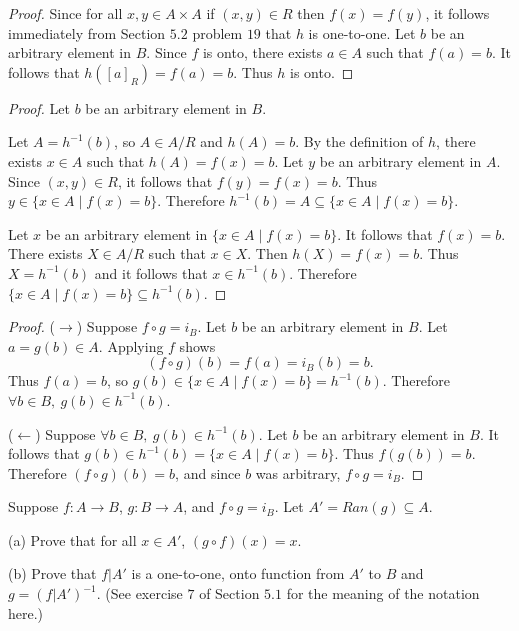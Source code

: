 \begin{proof}
    Since for all $x, y \in A \times A$
        if $(x, y) \in R$ then $f(x) = f(y)$,
        it follows immediately from Section $5.2$ 
        problem $19$ that $h$ is one-to-one.
    Let $b$ be an arbitrary element in $B$.
    Since $f$ is onto, there exists $a \in A$
        such that $f(a) = b$.
    It follows that $h([a]_R) = f(a) = b$.
    Thus $h$ is onto.
\end{proof}

\begin{proof}
    Let $b$ be an arbitrary element in $B$.

    Let $A = h^{-1}(b)$, so $A \in A / R$ and $h(A) = b$.
    By the definition of $h$, there exists $x \in A$ such that $h(A) = f(x) = b$.
    Let $y$ be an arbitrary element in $A$.
    Since $(x, y) \in R$, it follows that $f(y) = f(x) = b$.
    Thus $y \in \{x \in A \mid f(x) = b\}$.
    Therefore $h^{-1}(b) = A \subseteq \{x \in A \mid f(x) = b\}$.

    Let $x$ be an arbitrary element in $\{x \in A \mid f(x) = b\}$.
    It follows that $f(x) = b$.
    There exists $X \in A / R$ such that $x \in X$.
    Then $h(X) = f(x) = b$.
    Thus $X = h^{-1}(b)$ and it follows that $x \in  h^{-1}(b)$.
    Therefore $\{x \in A \mid f(x) = b\} \subseteq h^{-1}(b)$.
\end{proof}

\begin{proof}
    ($\rightarrow$) Suppose $f \circ g = i_B$.
    Let $b$ be an arbitrary element in $B$.
    Let $a = g(b) \in A$.
    Applying $f$ shows 
    \[(f \circ g)(b) = f(a) = i_B(b) = b.\]
    Thus $f(a) = b$, so $g(b) \in \{x \in A \mid f(x) = b\} = h^{-1}(b)$.
    Therefore $\forall b \in B,\ g(b) \in h^{-1}(b)$.

    ($\leftarrow$) Suppose $\forall b \in B,\ g(b) \in h^{-1}(b)$.
    Let $b$ be an arbitrary element in $B$.
    It follows that $g(b) \in h^{-1}(b) = \{x \in A \mid f(x) = b\}$.
    Thus $f(g(b)) = b$.
    Therefore $(f \circ g)(b) = b$, and since $b$ was arbitrary, $f \circ g = i_B$.
\end{proof}

\begin{tcolorbox}[title=Problem 14, breakable]
    Suppose $f : A \rightarrow B$, $g : B \rightarrow A$, and $f \circ g = i_B$.
    Let $A' = Ran(g) \subseteq A$.

    (a) Prove that for all $x \in A'$, $(g \circ f)(x) = x$.

    (b) Prove that $f | A'$ is a one-to-one, onto function from $A'$ to $B$
        and $g = (f | A')^{-1}$. (See exercise $7$ of Section $5.1$ for the 
        meaning of the notation here.)
\end{tcolorbox}

